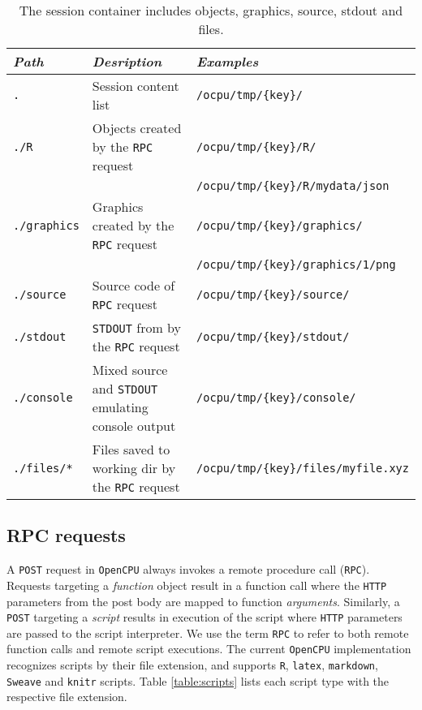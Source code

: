 \documentclass{article}
\newcommand{\POST}{\texttt{POST}\xspace}
\newcommand{\R}{\texttt{R}\xspace}
\newcommand{\HTTP}{\texttt{HTTP}\xspace}
\newcommand{\RPC}{\texttt{RPC}\xspace}
\newcommand{\OpenCPU}{\texttt{OpenCPU}\xspace}
\begin{document}
\begin{table}[H]
\centering
\def\arraystretch{1.3}%
\begin{tabular}{@{}lll@{}}
\toprule
\emph{Path}          & \emph{Desription}                      & \emph{Examples}                \\ 
\midrule
\texttt{.}          & Session content list                                       & \texttt{/ocpu/tmp/\{key\}/}               \\
\texttt{./R}        & Objects created by the \RPC request                        & \texttt{/ocpu/tmp/\{key\}/R/}             \\
                    &                                                            & \texttt{/ocpu/tmp/\{key\}/R/mydata/json}  \\
\texttt{./graphics} & Graphics created by the \RPC request                       & \texttt{/ocpu/tmp/\{key\}/graphics/}      \\
                    &                                                            & \texttt{/ocpu/tmp/\{key\}/graphics/1/png} \\
\texttt{./source}   & Source code of \RPC request                                & \texttt{/ocpu/tmp/\{key\}/source/}       \\
\texttt{./stdout}   & \texttt{STDOUT} from by the \RPC request                   & \texttt{/ocpu/tmp/\{key\}/stdout/}       \\
\texttt{./console}  & Mixed source and \texttt{STDOUT} emulating console output  & \texttt{/ocpu/tmp/\{key\}/console/}     \\
\texttt{./files/*}  & Files saved to working dir by the \RPC request             & \texttt{/ocpu/tmp/\{key\}/files/myfile.xyz}       \\

                                                
\bottomrule
\end{tabular}
\caption{The session container includes objects, graphics, source, stdout and files.}
\label{table:sessionapi}
\end{table}


\subsection{RPC requests}

A \POST request in \OpenCPU always invokes a remote procedure call (\RPC). Requests targeting a \emph{function} object result in a function call where the \HTTP parameters from the post body are mapped to function \emph{arguments}. Similarly, a \texttt{POST} targeting a \emph{script} results in execution of the script where \HTTP parameters are passed to the script interpreter. We use the term \RPC to refer to both remote function calls and remote script executions. The current \OpenCPU implementation recognizes scripts by their file extension, and supports \R, \texttt{latex}, \texttt{markdown}, \texttt{Sweave} and \texttt{knitr} scripts. Table \ref{table:scripts} lists each script type with the respective file extension.
\end{document}
